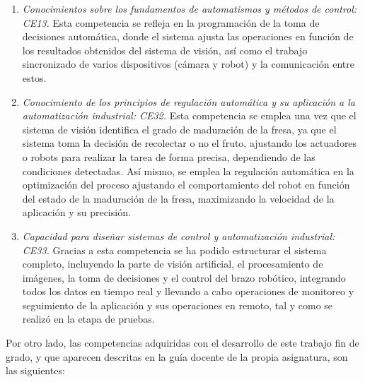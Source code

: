 \begin{enumerate}
  \item \textit{Conocimientos sobre los fundamentos de automatismos y métodos de control: CE13.} Esta competencia se refleja en la programación de la toma de decisiones automática, donde el sistema ajusta las operaciones en función de los resultados obtenidos del sistema de visión, así como el trabajo sincronizado de varios dispositivos (cámara y robot) y la comunicación entre estos.
  \item \textit{Conocimiento de los principios de regulación automática y su aplicación a la automatización industrial: CE32.} Esta competencia se emplea una vez que el sistema de visión identifica el grado de maduración de la fresa, ya que el sistema toma la decisión de recolectar o no el fruto, ajustando los actuadores o robots para realizar la tarea de forma precisa, dependiendo de las condiciones detectadas. Así mismo, se emplea la regulación automática en la optimización del proceso ajustando el comportamiento del robot en función del estado de la maduración de la fresa, maximizando la velocidad de la aplicación y su precisión.
  \item \textit{Capacidad para diseñar sistemas de control y automatización industrial: CE33.} Gracias a esta competencia se ha podido estructurar el sistema completo, incluyendo la parte de visión artificial, el procesamiento de imágenes, la toma de decisiones y el control del brazo robótico, integrando todos los datos en tiempo real y llevando a cabo operaciones de monitoreo y seguimiento de la aplicación y sus operaciones en remoto, tal y como se realizó en la etapa de pruebas.
  
\end{enumerate}  

Por otro lado, las competencias adquiridas con el desarrollo de este trabajo fin de grado, y que aparecen descritas en la guía docente de la propia asignatura, son las siguientes:

